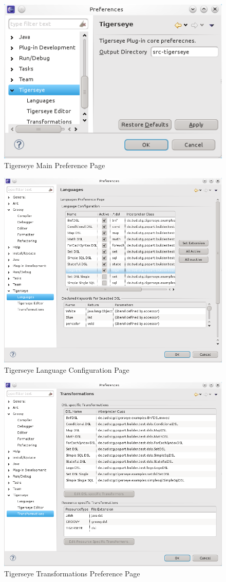 	\begin{figure}
	  \centering
	  \includegraphics[width=.5\textwidth,keepaspectratio=true]{../pics/preferences_main.png}
	  \caption{Tigerseye Main Preference Page}
	  \label{fig:prefs_main}
	\end{figure}

	\begin{figure}
	  \centering
	  \includegraphics[width=.5\textwidth,keepaspectratio=true]{../pics/preferences_languages.png}
	  \caption{Tigerseye Language Configuration Page}
	  \label{fig:prefs_languages}
	\end{figure}

	\begin{figure}
	  \centering
	  \includegraphics[width=.5\textwidth,keepaspectratio=true]{../pics/preferences_transformations.png}
	  \caption{Tigerseye Transformations Preference Page}
	  \label{fig:prefs_transformations}
	\end{figure}


